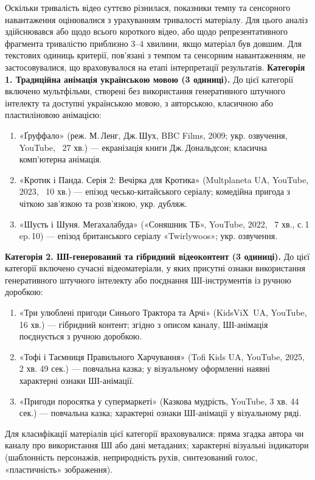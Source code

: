 \documentclass[14pt, a4paper]{extreport}
\begin{document}
Оскільки тривалість відео суттєво різнилася, показники темпу та сенсорного навантаження оцінювалися з урахуванням тривалості матеріалу. Для цього аналіз здійснювався або щодо всього короткого відео, або щодо репрезентативного фрагмента тривалістю приблизно 3--4 хвилини, якщо матеріал був довшим. Для текстових одиниць критерії, пов'язані з темпом та сенсорним навантаженням, не застосовувалися, що враховувалося на етапі інтерпретації результатів.
\newpage
\textbf{Категорія 1. Традиційна анімація українською мовою (3 одиниці).}
До цієї категорії включено мультфільми, створені без використання генеративного штучного інтелекту та доступні українською мовою, з авторською, класичною або пластиліновою анімацією:
\begin{enumerate}
  \item «Ґруффало» (реж. М.\,Ленг, Дж.\,Шух, BBC Films, 2009; укр. озвучення, YouTube, ~27 хв.) --- екранізація книги Дж.\,Дональдсон; класична комп'ютерна анімація.
  \item «Кротик і Панда. Серія 2: Вечірка для Кротика» (Multplaneta UA, YouTube, 2023, ~10 хв.) --- епізод чесько-китайського серіалу; комедійна пригода з чіткою зав'язкою та розв'язкою, укр. дубляж.
  \item «Шусть і Шуня. Мегахалабуда» («Соняшник ТБ», YouTube, 2022, ~7 хв., с.\,1 ep.\,10) --- епізод британського серіалу «Twirlywoos»; укр. озвучення.
\end{enumerate}

\textbf{Категорія 2. ШІ-генерований та гібридний відеоконтент (3 одиниці).}
До цієї категорії включено сучасні відеоматеріали, у яких присутні ознаки використання генеративного штучного інтелекту або поєднання ШІ-інструментів із ручною доробкою:
\begin{enumerate}
  \item «Три улюблені пригоди Синього Трактора та Арчі» (KidsViX~UA, YouTube, 16 хв.) --- гібридний контент; згідно з описом каналу, ШІ-анімація поєднується з ручною доробкою.
  \item «Тофі і Таємниця Правильного Харчування» (Tofi Kids UA, YouTube, 2025, 2 хв. 49 сек.) --- повчальна казка; у візуальному оформленні наявні характерні ознаки ШІ-анімації.
  \item «Пригоди поросятка у супермаркеті» (Казкова мудрість, YouTube, 3 хв. 44 сек.) --- повчальна казка; характерні ознаки ШІ-анімації у візуальному ряді.
\end{enumerate}
\newpage
Для класифікації матеріалів цієї категорії враховувалися: пряма згадка автора чи каналу про використання ШІ або дані метаданих; характерні візуальні індикатори (шаблонність персонажів, неприродність рухів, синтезований голос, «пластичність» зображення).
\end{document}
